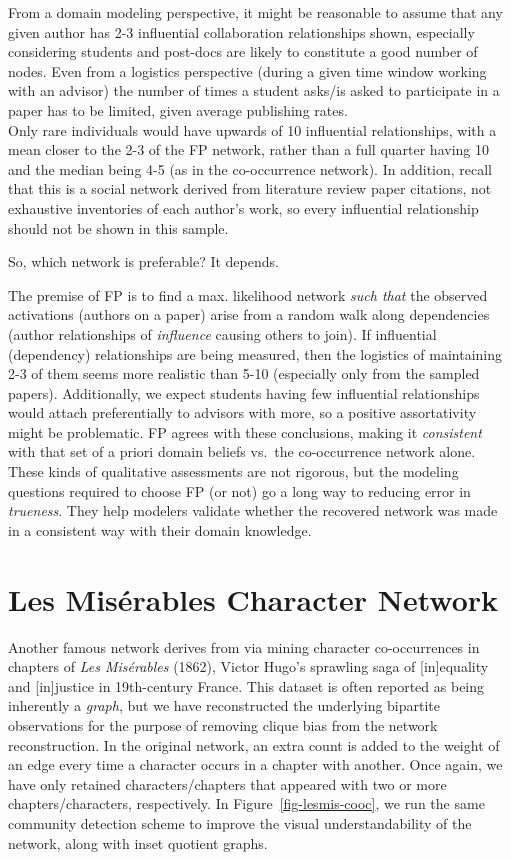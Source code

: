 \documentclass[%
	12pt,
		oneside,
		letterpaper
]{book}
\begin{document}
From a domain modeling perspective, it might be reasonable to assume
that any given author has 2-3 influential collaboration relationships
shown, especially considering students and post-docs are likely to
constitute a good number of nodes. Even from a logistics perspective
(during a given time window working with an advisor) the number of times
a student asks/is asked to participate in a paper has to be limited,
given average publishing rates.\\
Only rare individuals would have upwards of 10 influential
relationships, with a mean closer to the 2-3 of the FP network, rather
than a full quarter having 10 and the median being 4-5 (as in the
co-occurrence network). In addition, recall that this is a social
network derived from literature review paper citations, not exhaustive
inventories of each author's work, so every influential relationship
should not be shown in this sample.

So, which network is preferable? It depends.

The premise of FP is to find a max. likelihood network \emph{such that}
the observed activations (authors on a paper) arise from a random walk
along dependencies (author relationships of \emph{influence} causing
others to join). If influential (dependency) relationships are being
measured, then the logistics of maintaining 2-3 of them seems more
realistic than 5-10 (especially only from the sampled papers).
Additionally, we expect students having few influential relationships
would attach preferentially to advisors with more, so a positive
assortativity might be problematic. FP agrees with these conclusions,
making it \emph{consistent} with that set of a priori domain beliefs
vs.~the co-occurrence network alone. These kinds of qualitative
assessments are not rigorous, but the modeling questions required to
choose FP (or not) go a long way to reducing error in \emph{trueness}.
They help modelers validate whether the recovered network was made in a
consistent way with their domain knowledge.

\section{Les Misérables Character
Network}\label{les-misuxe9rables-character-network}

Another famous network derives from
\textcite{StanfordGraphBaseplatform_Knuth1993} via mining character
co-occurrences in chapters of \emph{Les Misérables} (1862), Victor
Hugo's sprawling saga of {[}in{]}equality and {[}in{]}justice in
19th-century France. This dataset is often reported as being inherently
a \emph{graph}, but we have reconstructed the underlying bipartite
observations for the purpose of removing clique bias from the network
reconstruction. In the original network, an extra count is added to the
weight of an edge every time a character occurs in a chapter with
another. Once again, we have only retained characters/chapters that
appeared with two or more chapters/characters, respectively. In
Figure~\ref{fig-lesmis-cooc}, we run the same community detection scheme
to improve the visual understandability of the network, along with inset
quotient graphs.
\end{document}
